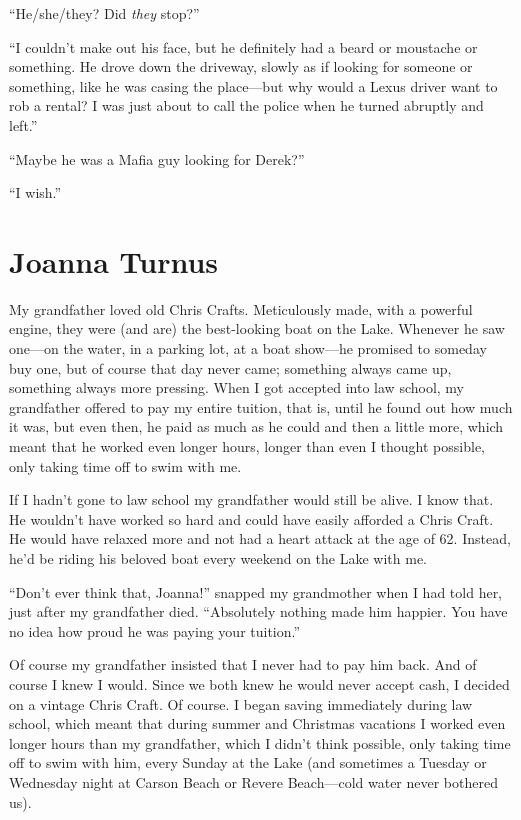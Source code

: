 ``He/she/they? Did \emph{they} stop?''

``I couldn't make out his face, but he definitely had a beard or
moustache or something. He drove down the driveway, slowly as if looking
for someone or something, like he was casing the place---but why would a
Lexus driver want to rob a rental? I was just about to call the police
when he turned abruptly and left.''

``Maybe he was a Mafia guy looking for Derek?''

``I wish.''

\chapter{Joanna Turnus}

\titlemark

My grandfather loved old Chris Crafts. Meticulously made, with a
powerful engine, they were (and are) the best-looking boat on the Lake.
Whenever he saw one---on the water, in a parking lot, at a boat
show---he promised to someday buy one, but of course that day never
came; something always came up, something always more pressing. When I
got accepted into law school, my grandfather offered to pay my entire
tuition, that is, until he found out how much it was, but even then, he
paid as much as he could and then a little more, which meant that he
worked even longer hours, longer than even I thought possible, only
taking time off to swim with me.

If I hadn't gone to law school my grandfather would still be alive. I
know that. He wouldn't have worked so hard and could have easily
afforded a Chris Craft. He would have relaxed more and not had a heart
attack at the age of 62. Instead, he'd be riding his beloved boat every
weekend on the Lake with me.

``Don't ever think that, Joanna!'' snapped my grandmother when I had
told her, just after my grandfather died. ``Absolutely nothing made him
happier. You have no idea how proud he was paying your tuition.''

Of course my grandfather insisted that I never had to pay him back. And
of course I knew I would. Since we both knew he would never accept cash,
I decided on a vintage Chris Craft. Of course. I began saving
immediately during law school, which meant that during summer and
Christmas vacations I worked even longer hours than my grandfather,
which I didn't think possible, only taking time off to swim with him,
every Sunday at the Lake (and sometimes a Tuesday or Wednesday night at
Carson Beach or Revere Beach---cold water never bothered us).

